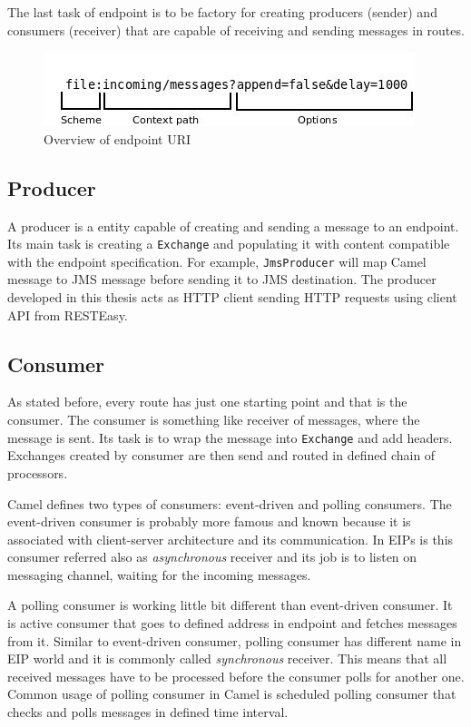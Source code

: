 \documentclass[12pt,final,oneside]{fithesis2}
\begin{document}
The last task of endpoint is to be factory for creating producers (sender) and consumers (receiver) that are capable of receiving and sending messages in routes.

\begin{figure}
\centering
\includegraphics[width=0.9\linewidth]{images/Diagram1.jpeg}
\caption{Overview of endpoint URI}
\label{uri}
\end{figure}

\subsection*{Producer}
A producer is a entity capable of creating and sending a message to an endpoint. Its main task is creating a \texttt{Exchange} and populating it with content compatible with the endpoint specification. For example, \texttt{JmsProducer} will map Camel message to JMS message before sending it to JMS destination. The producer developed in this thesis acts as HTTP client sending HTTP requests using client API from RESTEasy.


\subsection*{Consumer} 
As stated before, every route has just one starting point and that is the consumer. The consumer is something like receiver of messages, where the message is sent. Its task is to wrap the message into \texttt{Exchange} and add headers. Exchanges created by consumer are then send and routed in defined chain of processors.

Camel defines two types of consumers: event-driven and polling consumers. The event-driven consumer is probably more famous and known because it is associated with client-server architecture and its communication. In EIPs is this consumer referred also as \textit{asynchronous} receiver and its job is to listen on messaging channel, waiting for the incoming messages.

A polling consumer is working little bit different than event-driven consumer. It is active consumer that goes to defined address in endpoint and fetches messages from it. Similar to event-driven consumer, polling consumer has different name in EIP world and it is commonly called \textit{synchronous} receiver. This means that all received messages have to be processed before the consumer polls for another one. Common usage of polling consumer in Camel is scheduled polling consumer that checks and polls messages in defined time interval.
\end{document}
